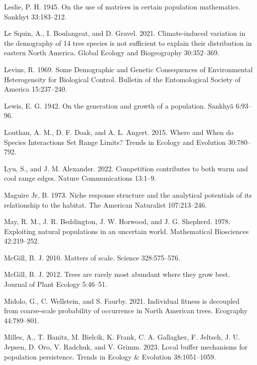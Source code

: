 \documentclass[12pt]{article}
\newlength{\cslhangindent}
\newenvironment{cslreferences}%
  {\setlength{\parindent}{0pt}%
  \everypar{\setlength{\hangindent}{\cslhangindent}}\ignorespaces}%
  {\par}
\begin{document}
\begin{cslreferences}
\leavevmode\hypertarget{ref-leslie1945}{}%
Leslie, P. H. 1945. On the use of matrices in certain population
mathematics. Sankhyt 33:183--212.

\leavevmode\hypertarget{ref-LeSquin2021}{}%
Le Squin, A., I. Boulangeat, and D. Gravel. 2021. Climate-induced
variation in the demography of 14 tree species is not sufficient to
explain their distribution in eastern North America. Global Ecology and
Biogeography 30:352--369.

\leavevmode\hypertarget{ref-Levins1969}{}%
Levins, R. 1969. Some Demographic and Genetic Consequences of
Environmental Heterogeneity for Biological Control. Bulletin of the
Entomological Society of America 15:237--240.

\leavevmode\hypertarget{ref-Lewis1942}{}%
Lewis, E. G. 1942. On the generation and growth of a population. Sankhyã
6:93--96.

\leavevmode\hypertarget{ref-Louthan2015}{}%
Louthan, A. M., D. F. Doak, and A. L. Angert. 2015. Where and When do
Species Interactions Set Range Limits? Trends in Ecology and Evolution
30:780--792.

\leavevmode\hypertarget{ref-Lyu2022}{}%
Lyu, S., and J. M. Alexander. 2022. Competition contributes to both warm
and cool range edges. Nature Communications 13:1--9.

\leavevmode\hypertarget{ref-maguire1973niche}{}%
Maguire Jr, B. 1973. Niche response structure and the analytical
potentials of its relationship to the habitat. The American Naturalist
107:213--246.

\leavevmode\hypertarget{ref-May1978}{}%
May, R. M., J. R. Beddington, J. W. Horwood, and J. G. Shepherd. 1978.
Exploiting natural populations in an uncertain world. Mathematical
Biosciences 42:219--252.

\leavevmode\hypertarget{ref-McGill2010}{}%
McGill, B. J. 2010. Matters of scale. Science 328:575--576.

\leavevmode\hypertarget{ref-McGill2012}{}%
McGill, B. J. 2012. Trees are rarely most abundant where they grow best.
Journal of Plant Ecology 5:46--51.

\leavevmode\hypertarget{ref-Midolo2021}{}%
Midolo, G., C. Wellstein, and S. Faurby. 2021. Individual fitness is
decoupled from coarse-scale probability of occurrence in North American
trees. Ecography 44:789--801.

\leavevmode\hypertarget{ref-milles2023}{}%
Milles, A., T. Banitz, M. Bielcik, K. Frank, C. A. Gallagher, F.
Jeltsch, J. U. Jepsen, D. Oro, V. Radchuk, and V. Grimm. 2023. Local
buffer mechanisms for population persistence. Trends in Ecology \&
Evolution 38:1051--1059.


\end{cslreferences}
\end{document}
